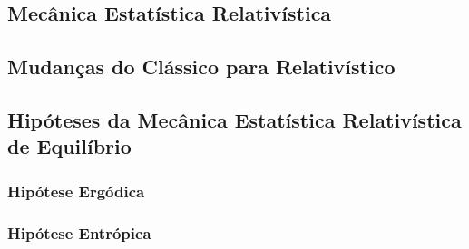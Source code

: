 \documentclass[twoside,reqno]{amsart}
\numberwithin{equation}{section}
\begin{document}
\begin{refsection}
\section{Mecânica Estatística Relativística}

\subsection{Mudanças do Clássico para Relativístico}

\subsection{Hipóteses da Mecânica Estatística Relativística de Equilíbrio}

\subsubsection{Hipótese Ergódica}

\subsubsection{Hipótese Entrópica}

\printbibliography[heading=subbibliography]
\end{refsection}

\end{document}
